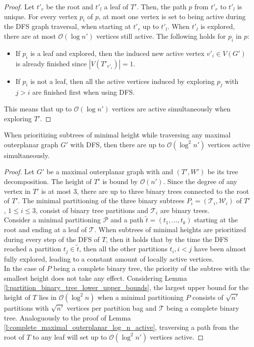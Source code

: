 \begin{proof}
	Let $t'_r$ be the root and $t'_l$ a leaf of $T'$. Then, the path $p$ from $t'_r$ to $t'_l$ is unique. For every vertex $p_i$ of $p$, at most one vertex is set to being active during the DFS graph traversal, when starting at $t'_r$ up to $t'_l$. When $t'_l$ is explored, there are at most $\mathcal{O}(\log n')$ vertices still active. 
	The following holds for $p_i$ in $p$:
	\begin{itemize}
		\item If $p_i$ is a leaf and explored, then the induced new active vertex $v'_i\in V(G')$ is already finished since $|V(T'_{v'_i})| = 1$.
		\item If $p_i$ is not a leaf, then all the active vertices induced by exploring $p_{j}$ with $j>i$ are finished first when using DFS.
	\end{itemize}
	This means that up to $\mathcal{O}(\log n')$ vertices are active simultaneously when exploring $T'$.
\end{proof}

\begin{lemma}
	When prioritizing subtrees of minimal height while traversing any maximal outerplanar graph $G'$ with DFS, then there are up to $\mathcal{O}(\log^2 n')$ vertices active simultaneously.\label{l:maximal_outerplanar_log2_n_vercies_active}
\end{lemma}

\begin{proof}
	Let $G'$ be a maximal outerplanar graph with and $(T',W')$ be its tree decomposition. The height of $T'$ is bound by $\mathcal{O}(n')$. Since the degree of any vertex in $T'$ is at most 3, there are up to three binary trees connected to the root of $T'$. The minimal partitioning of the three binary subtrees $P_i = (\mathcal{T}_i,\mathcal{W}_i)$ of $T'$, $1\leq i \leq 3$, consist of binary tree partitions and $\mathcal{T}_i$ are binary trees.\\
	Consider a minimal partitioning $\mathcal{P}$ and a path $\tilde{t} = (t_1,...,t_k)$ starting at the root and ending at a leaf of $\mathcal{T}$. When subtrees of minimal heights are prioritized during every step of the DFS of $T$, then it holds that by the time the DFS reached a partition $t_j \in \tilde{t}$, then all the other partitions $t_i, i<j$ have been almost fully explored, leading to a constant amount of locally active vertices.\\
	In the case of $P$ being a complete binary tree, the priority of the subtree with the smallest height does not take any effect. Considering Lemma \ref{l:partition_binary_tree_lower_upper_bounds}, the largest upper bound for the height of $T$ lies in $\mathcal{O}(\log^2 n)$ when a minimal partitioning $P$ consists of $\sqrt{n'}$ partitions with $\sqrt{n'}$ vertices per partition bag and $\mathcal{T}$ being a complete binary tree. Analoguously to the proof of Lemma \ref{l:complete_maximal_outerplanar_log_n_active}, traversing a path from the root of $T$ to any leaf will set up to $\mathcal{O}(\log^2 n')$ vertices active.
\end{proof}

